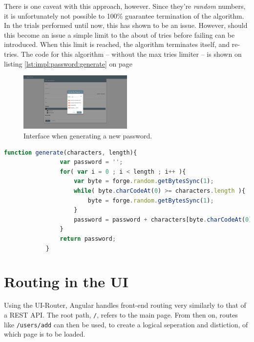 		There is one caveat with this approach, however. Since they're \emph{random} numbers, it is unfortunately not possible to 100\% guarantee termination of the algorithm. In the trials performed until now, this has shown to be an issue. However, should this become an issue a simple limit to the about of tries before failing can be introduced. When this limit is reached, the algorithm terminates itself, and re-tries. The code for this algorithm -- without the max tries limiter -- is shown on listing \ref{lst:impl:password:generate} on page \pageref{lst:impl:password:generate}


		\begin{figure}[!htb]
			\centering
			\includegraphics[width=0.5\textwidth,clip,trim=750 250 750 250]{figures/implementation/screenshots/add-password.png}
			\caption{Interface when generating a new password.}
			\label{fig:impl:password:generate}
		\end{figure}

		\begin{lstlisting}[language=Javascript,gobble=12,caption={Generating the password, using the value cut-off method},label={lst:impl:password:generate}]
            function generate(characters, length){
                var password = '';
                for( var i = 0 ; i < length ; i++ ){
                    var byte = forge.random.getBytesSync(1);
                    while( byte.charCodeAt(0) >= characters.length ){
                        byte = forge.random.getBytesSync(1);					
                    }
                    password = password + characters[byte.charCodeAt(0)];
                } 
                return password;
            }	
		\end{lstlisting}

	\section{Routing in the UI}
		\label{sec:impl:ui-router}
		Using the UI-Router, Angular handles front-end routing very similarly to that of a REST API. The root path, \verb=/=, refers to the main page. From then on, routes like \verb=/users/add= can then be used, to create a logical seperation and distiction, of which page is to be loaded.

